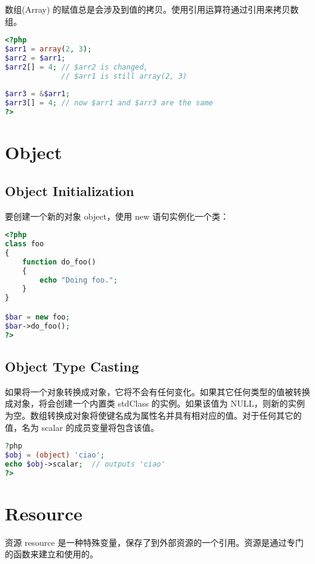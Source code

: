 数组(Array) 的赋值总是会涉及到值的拷贝。使用引用运算符通过引用来拷贝数组。


\begin{lstlisting}[language=PHP]
<?php
$arr1 = array(2, 3);
$arr2 = $arr1;
$arr2[] = 4; // $arr2 is changed,
             // $arr1 is still array(2, 3)
             
$arr3 = &$arr1;
$arr3[] = 4; // now $arr1 and $arr3 are the same
?>
\end{lstlisting}






\section{Object}

\subsection{Object Initialization}


要创建一个新的对象 object，使用 new 语句实例化一个类：

\begin{lstlisting}[language=PHP]
<?php
class foo
{
    function do_foo()
    {
        echo "Doing foo."; 
    }
}

$bar = new foo;
$bar->do_foo();
?>
\end{lstlisting}


\subsection{Object Type Casting}

如果将一个对象转换成对象，它将不会有任何变化。如果其它任何类型的值被转换成对象，将会创建一个内置类 stdClass 的实例。如果该值为 NULL，则新的实例为空。数组转换成对象将使键名成为属性名并具有相对应的值。对于任何其它的值，名为 scalar 的成员变量将包含该值。


\begin{lstlisting}[language=PHP]
?php
$obj = (object) 'ciao';
echo $obj->scalar;  // outputs 'ciao'
?>
\end{lstlisting}



\section{Resource}

资源 resource 是一种特殊变量，保存了到外部资源的一个引用。资源是通过专门的函数来建立和使用的。

